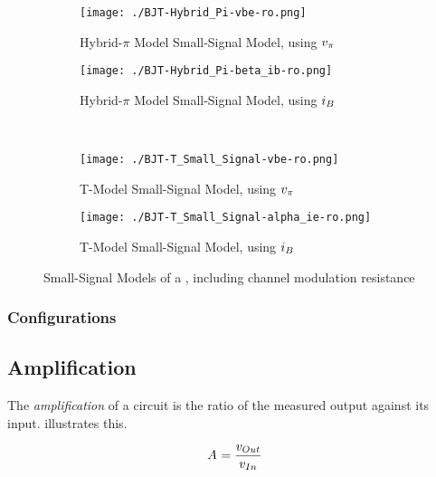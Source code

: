 \begin{figure}[h!tbp]
  \centering
  \begin{subfigure}{0.45\linewidth}
    \centering
    \texttt{[image: ./BJT-Hybrid\_Pi-vbe-ro.png]}
    \caption{Hybrid-$\pi$ Model Small-Signal Model, using $\ACVoltage{\pi}$ \parencite[p.~408]{sedraTextbook7}}
    \label{fig:BJT-Hybrid_Pi_Model-vbe-ro}
  \end{subfigure}
  \begin{subfigure}{0.45\linewidth}
    \centering
    \texttt{[image: ./BJT-Hybrid\_Pi-beta\_ib-ro.png]}
    \caption{Hybrid-$\pi$ Model Small-Signal Model, using $\ACCurrent{\Base}$ \parencite[p.~408]{sedraTextbook7}}
    \label{fig:BJT-Hybrid_Pi_Model-ib-ro}
  \end{subfigure}
  \\
  \begin{subfigure}{0.45\linewidth}
    \centering
    \texttt{[image: ./BJT-T\_Small\_Signal-vbe-ro.png]}
    \caption{T-Model Small-Signal Model, using $\ACVoltage{\pi}$ \parencite[p.~410]{sedraTextbook7}}
    \label{fig:BJT-T_Model-vpi-ro}
  \end{subfigure}
  \begin{subfigure}{0.45\linewidth}
    \centering
    \texttt{[image: ./BJT-T\_Small\_Signal-alpha\_ie-ro.png]}
    \caption{T-Model Small-Signal Model, using $\ACCurrent{\Base}$ \parencite[p.~410]{sedraTextbook7}}
    \label{fig:BJT-T_Model-ib-ro}
  \end{subfigure}
  \caption{Small-Signal Models of a , including channel modulation resistance}
  \label{fig:BJT-Small_Signal_Models-ro}
\end{figure}


\subsubsection{Configurations}\label{subsubsec:BJT_Configurations}

\subsection{Amplification}\label{subsec:Amplification}
The \emph{amplification} of a circuit is the ratio of the measured output against its input.
 illustrates this.

\begin{equation}\label{eq:Amplification}
  \Amp{} = \frac{\ACVoltage{\Out}}{\ACVoltage{\In}}
\end{equation}

